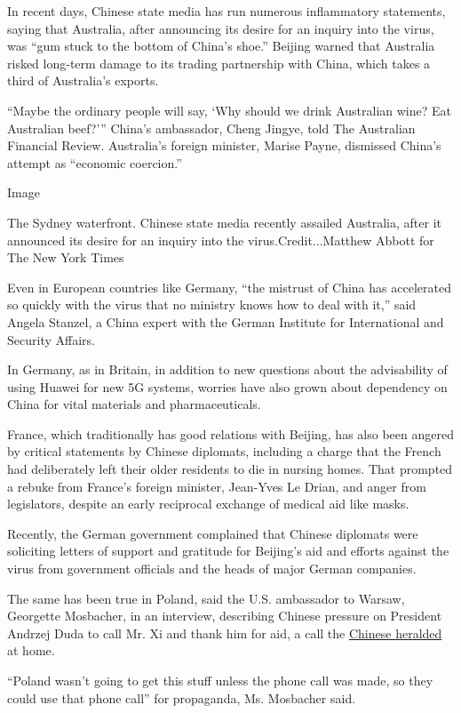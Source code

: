 In recent days, Chinese state media has run numerous inflammatory
statements, saying that Australia, after announcing its desire for an
inquiry into the virus, was ``gum stuck to the bottom of China's shoe.''
Beijing warned that Australia risked long-term damage to its trading
partnership with China, which takes a third of Australia's exports.

``Maybe the ordinary people will say, `Why should we drink Australian
wine? Eat Australian beef?''' China's ambassador, Cheng Jingye, told The
Australian Financial Review. Australia's foreign minister, Marise Payne,
dismissed China's attempt as ``economic coercion.''

Image

The Sydney waterfront. Chinese state media recently assailed Australia,
after it announced its desire for an inquiry into the
virus.Credit...Matthew Abbott for The New York Times

Even in European countries like Germany, ``the mistrust of China has
accelerated so quickly with the virus that no ministry knows how to deal
with it,'' said Angela Stanzel, a China expert with the German Institute
for International and Security Affairs.

In Germany, as in Britain, in addition to new questions about the
advisability of using Huawei for new 5G systems, worries have also grown
about dependency on China for vital materials and pharmaceuticals.

France, which traditionally has good relations with Beijing, has also
been angered by critical statements by Chinese diplomats, including a
charge that the French had deliberately left their older residents to
die in nursing homes. That prompted a rebuke from France's foreign
minister, Jean-Yves Le Drian, and anger from legislators, despite an
early reciprocal exchange of medical aid like masks.

Recently, the German government complained that Chinese diplomats were
soliciting letters of support and gratitude for Beijing's aid and
efforts against the virus from government officials and the heads of
major German companies.

The same has been true in Poland, said the U.S. ambassador to Warsaw,
Georgette Mosbacher, in an interview, describing Chinese pressure on
President Andrzej Duda to call Mr. Xi and thank him for aid, a call the
\href{https://www.fmprc.gov.cn/mfa_eng/zxxx_662805/t1761096.shtml}{Chinese
heralded} at home.

``Poland wasn't going to get this stuff unless the phone call was made,
so they could use that phone call'' for propaganda, Ms. Mosbacher said.

